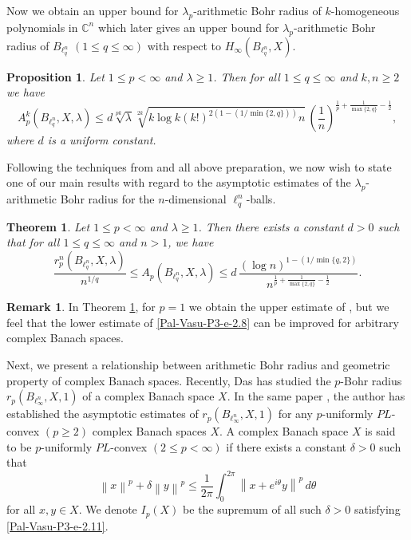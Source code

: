 \documentclass[a4paper,12pt]{amsart}
\newtheorem{thm}{Theorem}[section]
\newtheorem{prop}[equation]{Proposition}
\theoremstyle{definition}
\newtheorem{rem}{Remark}[section]
\newcommand{\norm}[1]{\left\lVert#1\right\rVert}
\begin{document}
Now we obtain an upper bound for $\lambda_p$-arithmetic Bohr radius of $k$-homogeneous polynomials in $\mathbb{C}^n$ which later gives an upper bound for $\lambda_{p}$-arithmetic Bohr radius of $B_{\ell^n_q}\,\,(1\leq q\leq \infty)$ with respect to $H_{\infty}(B_{\ell^n_q}, X).$
\begin{prop}\label{Pal-Vasu-P3-prop-2.4}
	Let $1\leq p< \infty$ and $\lambda \geq 1$. Then for all $1\leq q\leq \infty$ and $k, n \geq 2$ we have 
	\begin{equation*}
		A^k_p(B_{\ell^n_q},X, \lambda) \leq d \sqrt[pk]{\lambda} \sqrt[2k]{k\log k (k!)^{2(1-(1/\min\{2, q\}))}n}\, \left(\frac{1}{n}\right)^{\frac{1}{p}+\frac{1}{\max\{2, q\}}-\frac{1}{2}},
	\end{equation*}
where $d$ is a uniform constant.
\end{prop}

 Following the techniques from \cite{defant-2007, defant-2004} and all above preparation, we now wish to state one of our main results with regard to the asymptotic estimates of the $\lambda_p$-arithmetic Bohr radius for the $n$-dimensional $\ell^n_q$-balls.
\begin{thm}\label{Pal-Vasu-P3-thm-2.2}
	Let $1\leq p< \infty$ and $\lambda \geq 1$. Then there exists a constant $d>0$ such that for all $1\leq q\leq \infty$ and $n>1$, we have 
	\begin{equation}\label{Pal-Vasu-P3-e-2.8}
		\frac{r^n_p(B_{\ell^n_q},X,\lambda)}{n^{1/q}}\leq A_p(B_{\ell^n_q},X, \lambda)\leq d\, \frac{\left(\log n\right)^{1-\left(1/\min\{q, 2\}\right)}}{n^{\frac{1}{p}+\frac{1}{\max\{2, q\}}-\frac{1}{2} }}.
	\end{equation}
\end{thm}
\begin{rem}
	In  Theorem \ref{Pal-Vasu-P3-thm-2.2}, for $p=1$ we obtain the upper estimate of \cite[Theorem 4.1]{defant-2007}, but we feel that the lower estimate of \eqref{Pal-Vasu-P3-e-2.8} can be improved for arbitrary complex Banach spaces.
\end{rem}


Next, we present a relationship between arithmetic Bohr radius and geometric property of complex Banach spaces. Recently, Das \cite{das-2023} has studied the $p$-Bohr radius $r_p(B_{\ell^n_{\infty}}, X,1)$ of a complex Banach space $X$. In the same paper \cite[Theorem 1.5]{das-2023}, the author has established the asymptotic estimates of $r_p(B_{\ell^n_{\infty}}, X,1)$ for any $p$-uniformly $PL$-convex $(p\geq 2)$ complex Banach spaces $X$. A complex Banach space $X$ is said to be $p$-uniformly $PL$-convex $(2\leq p<\infty)$ if there exists a constant $\delta>0$ such that
\begin{equation}\label{Pal-Vasu-P3-e-2.11}
	\norm{x}^p+\delta \norm{y}^p\leq \frac{1}{2\pi}\int_{0}^{2\pi}\norm{x+e^{i\theta}y}^p\,d\theta
\end{equation}
for all $x, y \in X$. We denote $I_p(X)$ be the supremum of all such $\delta>0$ satisfying \eqref{Pal-Vasu-P3-e-2.11}.\\[1mm]
\end{document}
